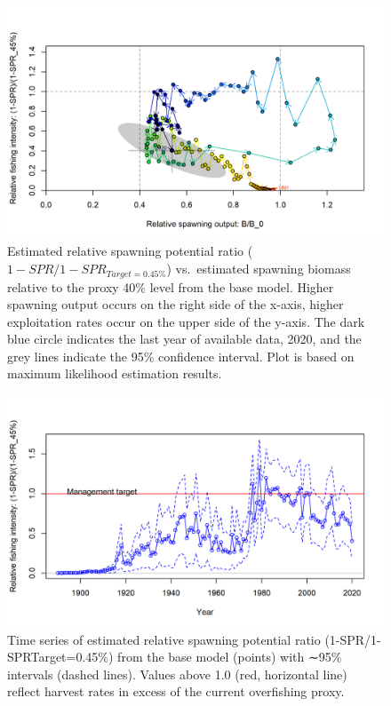 \documentclass[11pt,
  english,
  a4paper,
]{article}
\begin{document}
\begin{figure}
\centering
\includegraphics[width=1\textwidth,height=0.5\textheight]{figs/SPR4_phase.png}
\caption{Estimated relative spawning potential ratio ({\(1-SPR/1-SPR_{Target=0.45\%}\)\leavevmode\tagmcend\tagstructend}) vs.~estimated spawning biomass relative to the proxy 40\% level from the base model. Higher spawning output occurs on the right side of the x-axis, higher exploitation rates occur on the upper side of the y-axis. The dark blue circle indicates the last year of available data, 2020, and the grey lines indicate the 95\% confidence interval. Plot is based on maximum likelihood estimation results.}
\end{figure}

\tagmcend\tagstructend


\begin{figure}
\centering
\includegraphics[width=1\textwidth,height=0.5\textheight]{figs/SPR3_ratiointerval.png}
\caption{Time series of estimated relative spawning potential ratio (1-SPR/1-SPRTarget=0.45\%) from the base model (points) with ∼95\% intervals (dashed lines). Values above 1.0 (red, horizontal line) reflect harvest rates in excess of the current overfishing proxy.}
\end{figure}
\end{document}
